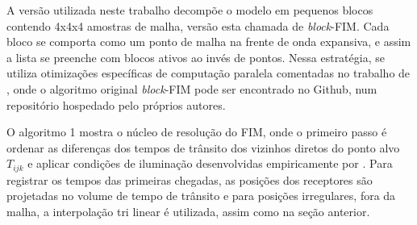 A versão utilizada neste trabalho decompõe o modelo em pequenos blocos contendo 4x4x4 amostras de malha, versão esta chamada de \textit{block}-FIM. Cada bloco se comporta como um ponto de malha na frente de onda expansiva, e assim a lista se preenche com blocos ativos ao invés de pontos. Nessa estratégia, se utiliza otimizações específicas de computação paralela comentadas no trabalho de , onde o algoritmo original \textit{block}-FIM pode ser encontrado no Github, num repositório hospedado pelo próprios autores.


O algoritmo 1 mostra o núcleo de resolução do FIM, onde o primeiro passo é ordenar as diferenças dos tempos de trânsito dos vizinhos diretos do ponto alvo $T_{ijk}$ e aplicar condições de iluminação desenvolvidas empiricamente por \cite{jeong2008fast}. Para registrar os tempos das primeiras chegadas, as posições dos receptores são projetadas no volume de tempo de trânsito e para posições irregulares, fora da malha, a interpolação tri linear é utilizada, assim como na seção anterior.  

